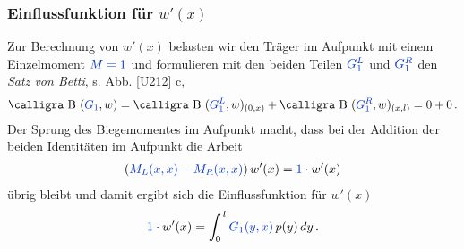 {\textcolor{sectionTitleBlue}{\subsubsection{Einflussfunktion f\"{u}r $w'(x) $}}}
Zur Berechnung von $w'(x) $ belasten wir den Tr\"{a}ger im Aufpunkt mit einem Einzelmoment $\textcolor{chapterTitleBlue}{M = 1} $ und formulieren mit den beiden Teilen $\textcolor{chapterTitleBlue}{G_1^L}$ und $\textcolor{chapterTitleBlue}{G_1^R}$ den {\em Satz von Betti\/}, s. Abb. \ref{U212} c,
\begin{align}
\text{\normalfont\calligra B\,\,}(\textcolor{chapterTitleBlue}{G_1},w) = \text{\normalfont\calligra B\,\,}(\textcolor{chapterTitleBlue}{G_1^L},w)_{(0,x)} + \text{\normalfont\calligra B\,\,}(\textcolor{chapterTitleBlue}{G_1^R},w)_{(x,l)} =  0 + 0\,.
\end{align}
Der Sprung des Biegemomentes im Aufpunkt macht, dass bei der Addition der beiden Identit\"{a}ten im Aufpunkt die Arbeit
\begin{align}
(\textcolor{chapterTitleBlue}{M_L(x,x) - M_R(x,x)})\,w'(x) = \textcolor{chapterTitleBlue}{1} \cdot w'(x)
\end{align}
\"{u}brig bleibt und damit ergibt sich die Einflussfunktion f\"{u}r $w'(x)$
\begin{align}
 \textcolor{chapterTitleBlue}{1}\cdot w'(x) = \int_0^{\,l} \textcolor{chapterTitleBlue}{G_1(y,x)}\,p(y)\,dy\,.
\end{align}

